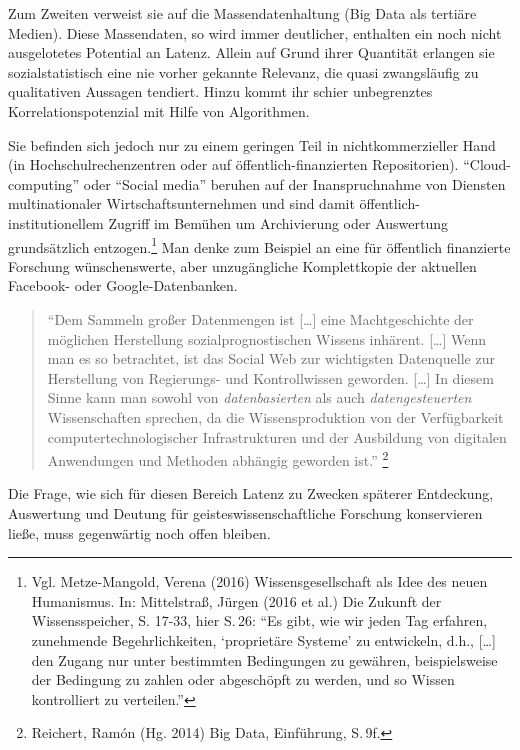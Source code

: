 \documentclass[a4paper,
fontsize=11pt,
oneside,
numbers=noperiodatend,
parskip=half-,
bibliography=totoc,
final
]{scrartcl}
\begin{document}
Zum Zweiten verweist sie auf die Massendatenhaltung (Big Data als
tertiäre Medien). Diese Massendaten, so wird immer deutlicher, enthalten
ein noch nicht ausgelotetes Potential an Latenz. Allein auf Grund ihrer
Quantität erlangen sie sozialstatistisch eine nie vorher gekannte
Relevanz, die quasi zwangsläufig zu qualitativen Aussagen tendiert.
Hinzu kommt ihr schier unbegrenztes Korrelationspotenzial mit Hilfe von
Algorithmen.

Sie befinden sich jedoch nur zu einem geringen Teil in
nichtkommerzieller Hand (in Hochschulrechenzentren oder auf
öffentlich-finanzierten Repositorien). \enquote{Cloud-computing} oder
\enquote{Social media} beruhen auf der Inanspruchnahme von Diensten
multinationaler Wirtschaftsunternehmen und sind damit
öffentlich-institutionellem Zugriff im Bemühen um Archivierung oder
Auswertung grundsätzlich entzogen.\footnote{Vgl. Metze-Mangold, Verena
  (2016) Wissensgesellschaft als Idee des neuen Humanismus. In:
  Mittelstraß, Jürgen (2016 et al.) Die Zukunft der Wissensspeicher, S.
  17-33, hier S.\,26: \enquote{Es gibt, wie wir jeden Tag erfahren,
  zunehmende Begehrlichkeiten, \enquote{proprietäre Systeme} zu
  entwickeln, d.h., {[}\ldots{}{]} den Zugang nur unter bestimmten
  Bedingungen zu gewähren, beispielsweise der Bedingung zu zahlen oder
  abgeschöpft zu werden, und so Wissen kontrolliert zu verteilen.}} Man
denke zum Beispiel an eine für öffentlich finanzierte Forschung
wünschenswerte, aber unzugängliche Komplettkopie der aktuellen Facebook-
oder Google-Datenbanken.

\begin{quote}
\enquote{Dem Sammeln großer Datenmengen ist {[}\ldots{}{]} eine
Machtgeschichte der möglichen Herstellung sozialprognostischen Wissens
inhärent. {[}\ldots{}{]} Wenn man es so betrachtet, ist das Social Web
zur wichtigsten Datenquelle zur Herstellung von Regierungs- und
Kontrollwissen geworden. {[}\ldots{}{]} In diesem Sinne kann man sowohl
von \emph{datenbasierten} als auch \emph{datengesteuerten}
Wissenschaften sprechen, da die Wissensproduktion von der Verfügbarkeit
computertechnologischer Infrastrukturen und der Ausbildung von digitalen
Anwendungen und Methoden abhängig geworden ist.} \footnote{Reichert,
  Ramón (Hg. 2014) Big Data, Einführung, S.\,9f.}
\end{quote}

Die Frage, wie sich für diesen Bereich Latenz zu Zwecken späterer
Entdeckung, Auswertung und Deutung für geisteswissenschaftliche
Forschung konservieren ließe, muss gegenwärtig noch offen bleiben.
\end{document}
